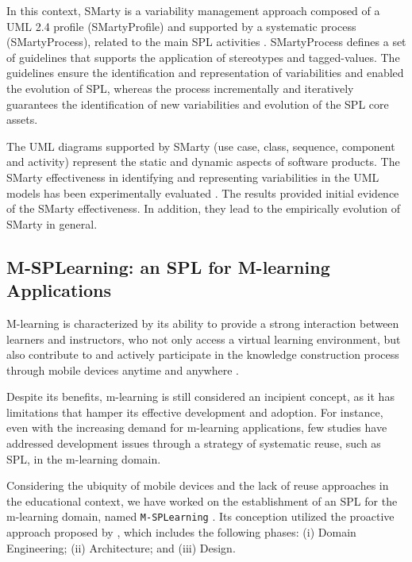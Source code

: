 In this context, SMarty is a variability management approach composed of a UML 2.4 profile (SMartyProfile) and supported by a systematic process (SMartyProcess), related to the main SPL activities \cite{oliveirajr10}. SMartyProcess defines a set of guidelines that supports the application of stereotypes and tagged-values. The guidelines ensure the identification and representation of variabilities and enabled the evolution of SPL, whereas the process incrementally and iteratively guarantees the identification of new variabilities and evolution of the SPL core assets.

The UML diagrams supported by SMarty (use case, class, sequence, component and activity) represent the static and dynamic aspects of software products. The SMarty effectiveness in identifying and representing variabilities in the UML models has been experimentally evaluated \cite{marcolino13,marcolino14a,marcolino14b,bera15}. The results provided initial evidence of the SMarty effectiveness. In addition, they lead to the empirically evolution of SMarty in general.

\subsection{M-SPLear\allowbreak ning: an SPL for M-learning Applications}

M-learning is characterized by its ability to provide a strong interaction between learners and instructors, who not only access a virtual learning environment, but also contribute to and actively participate in the knowledge construction process through mobile devices anytime and anywhere \cite{kukulska05}. 

Despite its benefits, m-learning is still considered an incipient concept, as it has limitations that hamper its effective development and adoption. For instance, even with the increasing demand for m-learning applications, few studies have addressed development issues through a strategy of systematic reuse, such as SPL, in the m-learning domain.  

Considering the ubiquity of mobile devices and the lack of reuse approaches in the educational context, we have worked on the establishment of an SPL for the m-learning domain, named \texttt{M-SPLear\allowbreak ning} \cite{falvojr14,falvojr14b}. Its conception utilized the proactive approach proposed by \cite{krueger02}, which includes the following phases: (i) Domain Engineering; (ii) Architecture; and (iii) Design.

